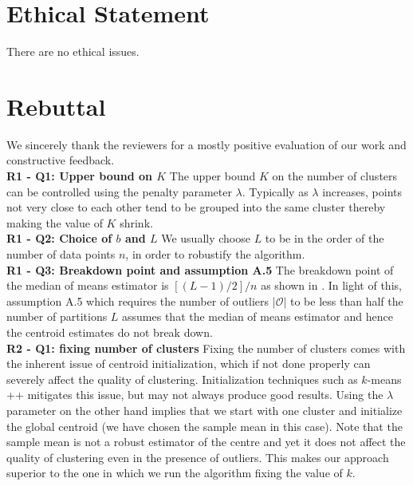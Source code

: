 \documentclass{article}
\begin{document}
\appendix

\section*{Ethical Statement}

There are no ethical issues.








\section*{Rebuttal}
We sincerely thank the reviewers for a mostly positive evaluation of our work and constructive feedback.\\
\textbf{R1 - Q1: Upper bound on $K$} The upper bound $K$ on the number of clusters can be controlled using the penalty parameter $\lambda$. Typically as $\lambda$ increases, points not very close to each other tend to be grouped into the same cluster thereby making the value of $K$ shrink.  \\
\textbf{R1 - Q2: Choice of $b$ and $L$} We usually choose $L$ to be in the order of the number of data points $n$, in order to robustify the algorithm.\\
\textbf{R1 - Q3: Breakdown point and assumption A.5} The breakdown point of the median of means estimator is $[(L-1)/2]/n$ as shown in \cite{rodriguez2019breakdown}. In light of this, assumption A.5 which requires the number of outliers $|\mathcal{O}|$ to be less than half the number of partitions $L$ assumes that the median of means estimator and hence the centroid estimates do not break down.\\
\textbf{R2 - Q1: fixing number of clusters} Fixing the number of clusters comes with the inherent issue of centroid initialization, which if not done properly can severely affect the quality of clustering. Initialization techniques such as $k$-means ++ \cite{Arthur2007kmeansTA} mitigates this issue, but may not always produce good results. Using the $\lambda$ parameter on the other hand implies that we start with one cluster and initialize the global centroid (we have chosen the sample mean in this case). Note that the sample mean is not a robust estimator of the centre and yet it does not affect the quality of clustering even in the presence of outliers. This makes our approach superior to the one in which we run the algorithm fixing the value of $k$.\\
\end{document}
